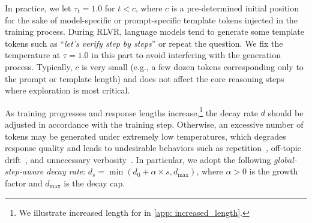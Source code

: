 %
In practice, we let $\tau_t = 1.0$ for $t<c$, where $c$ is a pre-determined initial position for the sake of model-specific or prompt-specific template tokens injected in the training process. 
%
During RLVR, language models tend to generate some template tokens such as ``\textit{let's verify step by steps}'' or repeat the question. 
%
We fix the temperature at $\tau = 1.0$ in this part to avoid interfering with the generation process. Typically, $c$ is very small (e.g., a few dozen tokens corresponding only to the prompt or template length) and does not affect the core reasoning steps where exploration is most critical.
%


As training progresses and response lengths increase,\footnote{We illustrate increased length for \alg in \cref{app: increased_length}. } the decay rate $d$ should be adjusted in accordance with the training step.
%
Otherwise, an excessive number of tokens may be generated under extremely low temperatures, which degrades response quality and leads to undesirable behaviors such as repetition~\citep{guo2025deepseek}, off-topic drift~\citep{spataru2024know}, and unnecessary verbosity~\citep{Holtzman2020The}. 
%
In particular, we adopt the following \emph{global-step-aware decay rate}:
$d_s = \min(d_0 + \alpha \times s, d_{\max})$, where $\alpha > 0$ is the growth factor and $d_{\max}$ is the decay cap. 


